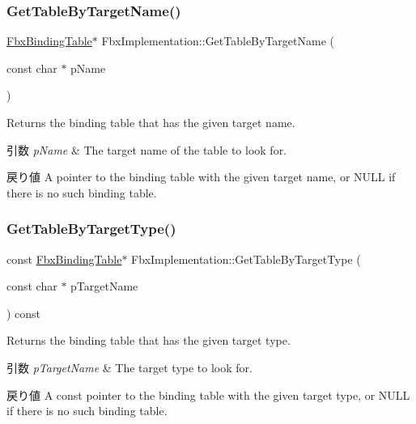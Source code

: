 \subsubsection{\texorpdfstring{Get\+Table\+By\+Target\+Name()}{GetTableByTargetName()}\hspace{0.1cm}{\footnotesize\ttfamily [2/2]}}
{\footnotesize\ttfamily \hyperlink{class_fbx_binding_table}{Fbx\+Binding\+Table}$\ast$ Fbx\+Implementation\+::\+Get\+Table\+By\+Target\+Name (\begin{DoxyParamCaption}\item[{const char $\ast$}]{p\+Name }\end{DoxyParamCaption})}

Returns the binding table that has the given target name. 
\begin{DoxyParams}{引数}
{\em p\+Name} & The target name of the table to look for. \\
\hline
\end{DoxyParams}
\begin{DoxyReturn}{戻り値}
A pointer to the binding table with the given target name, or N\+U\+LL if there is no such binding table. 
\end{DoxyReturn}
\mbox{\label{class_fbx_implementation_a9a8f103f0b874ff491c7f31b8b8555b4}} 
\subsubsection{\texorpdfstring{Get\+Table\+By\+Target\+Type()}{GetTableByTargetType()}\hspace{0.1cm}{\footnotesize\ttfamily [1/2]}}
{\footnotesize\ttfamily const \hyperlink{class_fbx_binding_table}{Fbx\+Binding\+Table}$\ast$ Fbx\+Implementation\+::\+Get\+Table\+By\+Target\+Type (\begin{DoxyParamCaption}\item[{const char $\ast$}]{p\+Target\+Name }\end{DoxyParamCaption}) const}

Returns the binding table that has the given target type. 
\begin{DoxyParams}{引数}
{\em p\+Target\+Name} & The target type to look for. \\
\hline
\end{DoxyParams}
\begin{DoxyReturn}{戻り値}
A const pointer to the binding table with the given target type, or N\+U\+LL if there is no such binding table. 
\end{DoxyReturn}
\mbox{\label{class_fbx_implementation_af8fa4603b3a3226997504f4ca518f1c4}} 

